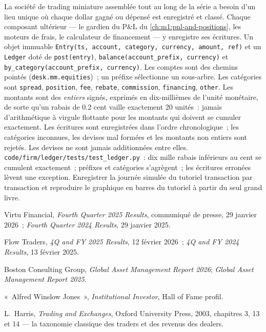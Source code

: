 \begin{build}
 La société de trading miniature assemblée tout au long de la série
a besoin d'un lieu unique où chaque dollar gagné ou dépensé est enregistré et
classé. Chaque composant ultérieur --- le gardien du P\&L
du \cref{ch:m1:pnl-and-positions}, les moteurs de frais, le calculateur de financement ---
y enregistre ses écritures.
 Un objet immuable \texttt{Entry(ts, account, category,
currency, amount, ref)} et un \texttt{Ledger} doté de \texttt{post(entry)},
\texttt{balance(account\_prefix, currency)} et
\texttt{by\_category(account\_prefix, currency)}. Les comptes sont des chemins pointés
(\texttt{desk.mm.equities})~; un préfixe sélectionne un sous-arbre. Les catégories sont
\texttt{spread}, \texttt{position}, \texttt{fee}, \texttt{rebate},
\texttt{commission}, \texttt{financing}, \texttt{other}.
 Les montants sont des \emph{entiers} signés, exprimés en dix-millièmes de
l'unité monétaire, de sorte qu'un rabais de 0.2 cent vaille exactement 20 unités~: jamais
d'arithmétique à virgule flottante pour les montants qui doivent se cumuler exactement. Les écritures sont enregistrées dans l'ordre chronologique~;
les catégories inconnues, les devises mal formées et les montants non entiers sont
rejetés. Les devises ne sont jamais additionnées entre elles.
 \texttt{code/firm/ledger/tests/test\_ledger.py}~:
dix mille rabais inférieurs au cent se cumulent exactement~; préfixes et catégories s'agrègent~;
les écritures erronées lèvent une exception.
 Enregistrer la journée simulée du tutoriel transaction par transaction et
reproduire le graphique en barres du tutoriel à partir du seul grand livre.
\end{build}

\begin{omsources}
\item Virtu Financial, \emph{Fourth Quarter 2025 Results}, communiqué de presse,
29 janvier 2026~; \emph{Fourth Quarter 2024 Results}, 29 janvier 2025.
\item Flow Traders, \emph{4Q and FY 2025 Results}, 12 février 2026~;
\emph{4Q and FY 2024 Results}, 13 février 2025.
\item Boston Consulting Group, \emph{Global Asset Management Report 2026};
\emph{Global Asset Management Report 2025}.
\item «~Alfred Winslow Jones~», \emph{Institutional Investor}, Hall of Fame
profil.
\item L.~Harris, \emph{Trading and Exchanges}, Oxford University Press, 2003,
chapitres 3, 13 et 14 --- la taxonomie classique des traders et des
revenus des dealers.
\end{omsources}

